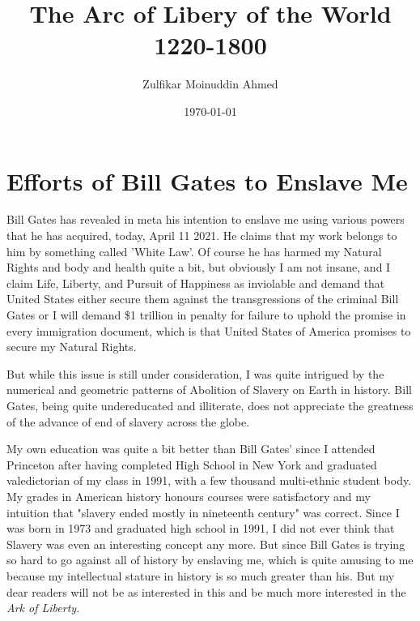 \documentclass{amsart}
\title{The Arc of Libery of the World 1220-1800}
\author{Zulfikar Moinuddin Ahmed}
\date{\today}
\begin{document}
\maketitle

\section{Efforts of Bill Gates to Enslave Me}
Bill Gates has revealed in meta his intention to enslave me using various powers that he has acquired, today, April 11 2021.   He claims that my work belongs to him by something called 'White Law'.  Of course he has harmed my Natural Rights and body and health quite a bit, but obviously I am not insane, and I claim Life, Liberty, and Pursuit of Happiness as inviolable and demand that United States either secure them against the transgressions of the criminal Bill Gates or I will demand \$1 trillion in penalty for failure to uphold the promise in every immigration document, which is that United States of America promises to secure my Natural Rights.  

But while this issue is still under consideration, I was quite intrigued by the numerical and geometric patterns of Abolition of Slavery on Earth in history.  Bill Gates, being quite undereducated and illiterate, does not appreciate the greatness of the advance of end of slavery across the globe.  

My own education was quite a bit better than Bill Gates' since I attended Princeton after having completed High School in New York and graduated valedictorian of my class in 1991, with a few thousand multi-ethnic student body.  My grades in American history honours courses were satisfactory and my intuition that "slavery ended mostly in nineteenth century" was correct.  Since I was born in 1973 and graduated high school in 1991, I did not ever think that Slavery was even an interesting concept any more.  But since Bill Gates is trying so hard to go against all of history by enslaving me, which is quite amusing to me because my intellectual stature in history is so much greater than his. But my dear readers will not be as interested in this and be much more interested in the {\em Ark of Liberty}.
\end{document}
